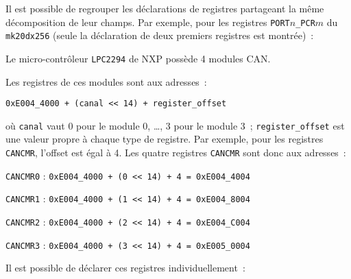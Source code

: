 
Il est possible de regrouper les déclarations de registres partageant la même décomposition de leur champs. Par exemple, pour les registres \texttt{PORT$n$\_PCR$m$} du \texttt{mk20dx256} (seule la déclaration de deux premiers registres est montrée)~:













Le micro-contrôleur \texttt{LPC2294} de NXP possède 4 modules CAN.


Les registres de ces modules sont aux adresses~:

\texttt{0xE004\_4000 + (canal << 14) + register\_offset}

où \texttt{canal} vaut $0$ pour le module $0$, …, $3$ pour le module 3~; \texttt{register\_offset} est une valeur propre à chaque type de registre. Par exemple, pour les registres \texttt{CANCMR}, l'offset est égal à 4. Les quatre registres \texttt{CANCMR} sont donc aux adresses~:

\texttt{CANCMR0} : \texttt{0xE004\_4000 + (0 << 14) + 4 = 0xE004\_4004}

\texttt{CANCMR1} : \texttt{0xE004\_4000 + (1 << 14) + 4 = 0xE004\_8004}

\texttt{CANCMR2} : \texttt{0xE004\_4000 + (2 << 14) + 4 = 0xE004\_C004}

\texttt{CANCMR3} : \texttt{0xE004\_4000 + (3 << 14) + 4 = 0xE005\_0004}

Il est possible de déclarer ces registres individuellement~:


